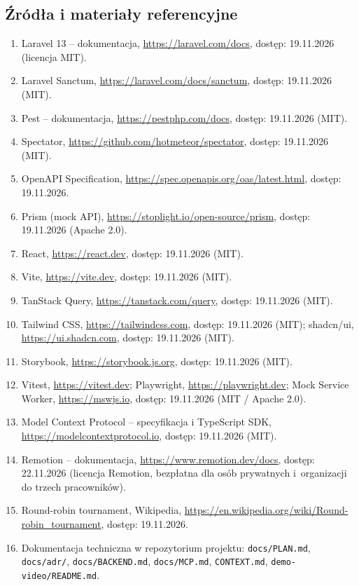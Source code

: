 \documentclass[11pt,a4paper,oneside]{article}
\newif\ifpodpowiedzi
\newcommand{\podpowiedz}[1]{\ifpodpowiedzi\par\begingroup\small\color{hintcolor}\textit{Wskazówka: #1}\par\endgroup\fi}
\begin{document}
\subsection{Źródła i materiały referencyjne}
\podpowiedz{Wymień dokumentację, publikacje, biblioteki, modele i zasoby przywołane w dokumencie. Dla źródeł internetowych podaj tytuł, adres i datę dostępu. Wskaż licencje lub inne warunki wykorzystania materiałów zewnętrznych. Nie pozostawiaj fikcyjnych źródeł.}
\begin{enumerate}
\item Laravel 13 -- dokumentacja, \url{https://laravel.com/docs}, dostęp: 19.11.2026 (licencja MIT).
\item Laravel Sanctum, \url{https://laravel.com/docs/sanctum}, dostęp: 19.11.2026 (MIT).
\item Pest -- dokumentacja, \url{https://pestphp.com/docs}, dostęp: 19.11.2026 (MIT).
\item Spectator, \url{https://github.com/hotmeteor/spectator}, dostęp: 19.11.2026 (MIT).
\item OpenAPI Specification, \url{https://spec.openapis.org/oas/latest.html}, dostęp: 19.11.2026.
\item Prism (mock API), \url{https://stoplight.io/open-source/prism}, dostęp: 19.11.2026 (Apache 2.0).
\item React, \url{https://react.dev}, dostęp: 19.11.2026 (MIT).
\item Vite, \url{https://vite.dev}, dostęp: 19.11.2026 (MIT).
\item TanStack Query, \url{https://tanstack.com/query}, dostęp: 19.11.2026 (MIT).
\item Tailwind CSS, \url{https://tailwindcss.com}, dostęp: 19.11.2026 (MIT); shadcn/ui, \url{https://ui.shadcn.com}, dostęp: 19.11.2026 (MIT).
\item Storybook, \url{https://storybook.js.org}, dostęp: 19.11.2026 (MIT).
\item Vitest, \url{https://vitest.dev}; Playwright, \url{https://playwright.dev}; Mock Service Worker, \url{https://mswjs.io}, dostęp: 19.11.2026 (MIT / Apache 2.0).
\item Model Context Protocol -- specyfikacja i TypeScript SDK, \url{https://modelcontextprotocol.io}, dostęp: 19.11.2026 (MIT).
\item Remotion -- dokumentacja, \url{https://www.remotion.dev/docs}, dostęp: 22.11.2026 (licencja Remotion, bezpłatna dla osób prywatnych i~organizacji do trzech pracowników).
\item Round-robin tournament, Wikipedia, \url{https://en.wikipedia.org/wiki/Round-robin_tournament}, dostęp: 19.11.2026.
\item Dokumentacja techniczna w repozytorium projektu: \texttt{docs/PLAN.md}, \texttt{docs/adr/}, \texttt{docs/BACKEND.md}, \texttt{docs/MCP.md}, \texttt{CONTEXT.md}, \texttt{demo-video/README.md}.
\end{enumerate}
\end{document}
